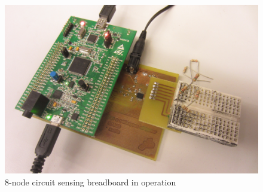 \documentclass[11pt,twoside]{mitthesis}
\begin{document}
\begin{figure}[h]
  \begin{center}
      \includegraphics[width=\textwidth]{../system.png}
      \caption{8-node circuit sensing breadboard in operation}
  \end{center}
\end{figure}


\ifdefined\DEBUG
\end{document}
